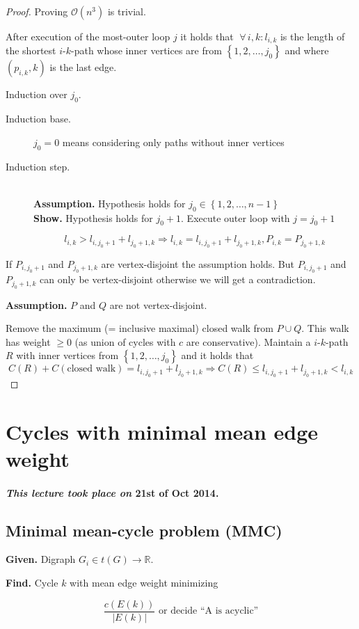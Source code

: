 \documentclass{article}
\newcommand{\set}[1]{\left\{#1\right\}}
\newcommand{\given}[1]{\textbf{Given.} #1\par}
\newcommand{\find}[1]{\textbf{Find.} #1\par}
\newcommand{\dateref}[1]{\paragraph{\textit{This lecture took place on} #1.}}
\newcommand{\gath}[2]{$#1$-$#2$-path} %
\newcommand{\fall}{\;\forall\,}
\begin{document}
\begin{proof}
Proving $\mathcal{O}(n^3)$ is trivial.

After execution of the most-outer loop $j$ it holds that $\fall i,k: l_{i,k}$ is the length of the shortest \gath ik whose inner vertices are from $\set{1, 2, \ldots, j_0}$ and where $(p_{i,k}, k)$ is the last edge.

Induction over $j_0$.

\begin{description}
  \item[Induction base.] $j_0 = 0$ means considering only paths without inner vertices
  \item[Induction step.] \hfill{} \\
    \textbf{Assumption.} Hypothesis holds for $j_0 \in \set{1, 2, \ldots, n-1}$ \\
    \textbf{Show.} Hypothesis holds for $j_0 + 1$.
    Execute outer loop with $j = j_0 + 1$

    \[
      l_{i,k} > l_{i,j_0+1} + l_{j_0+1,k} \Rightarrow
        l_{i,k} = l_{i,j_0+1} + l_{j_0+1,k}, P_{i,k} = P_{j_0+1,k}
    \]
\end{description}

If $P_{i,j_0+1}$ and $P_{j_0+1,k}$ are vertex-disjoint the assumption holds. But $P_{i,j_0+1}$ and $P_{j_0+1,k}$ can only be vertex-disjoint otherwise we will get a contradiction.

\textbf{Assumption.}
 $P$ and $Q$ are not vertex-disjoint.

Remove the maximum (= inclusive maximal) closed walk from $P \cup Q$. This walk has weight $\geq 0$ (as union of cycles with $c$ are conservative). Maintain a \gath ik $R$ with inner vertices from $\set{1, 2, \ldots, j_0}$ and it holds that
\[
  C(R) + C(\text{closed walk}) = l_{i,j_0+1} + l_{j_0+1,k}
    \Rightarrow C(R) \leq l_{i,j_0+1} + l_{j_0+1,k} < l_{i,k}
\]
\end{proof}

\section{Cycles with minimal mean edge weight}
%
\dateref{21st of Oct 2014}
%
\subsection{Minimal mean-cycle problem (MMC)}
%
\given{Digraph $G_i \in t(G) \rightarrow \mathbb{R}$.}
\find{Cycle $k$ with mean edge weight minimizing}
\[
  \frac{c(E(k))}{|E(k)|} \text{ or decide ``A is acyclic''}
\]
\end{document}
